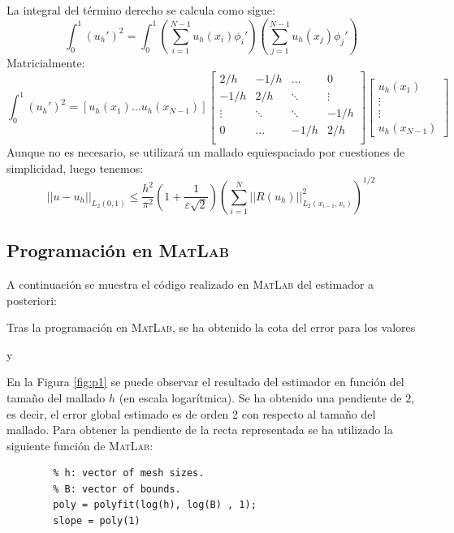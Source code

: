 \documentclass[spanish]{mathnotes}
\begin{document}
	La integral del término derecho se calcula como sigue:
	$$\int_0^1 (u_h')^2 = \int_0^1 \left(\sum_{i=1}^{N-1}u_h(x_i)\phi_i'\right)\left(\sum_{j=1}^{N-1}u_h(x_j)\phi_j'\right)$$
	Matricialmente:
	\begin{equation*}
		\int_0^1 (u_h')^2 =
		\left[
			u_h(x_1) \hdots  u_h(x_{N-1})
		\right]
		\begin{bmatrix}
			2/h  & -1/h & \hdots & 0\\
			-1/h &  2/h & \ddots & \vdots\\
			\vdots & \ddots & \ddots & -1/h\\
			0 & \hdots & -1/h & 2/h\\
		\end{bmatrix}
		\begin{bmatrix}
			u_h(x_1) \\ \vdots \\ \vdots \\ u_h(x_{N-1})
		\end{bmatrix}
	\end{equation*}
	Aunque no es necesario, se utilizará un mallado equiespaciado por cuestiones de simplicidad, luego tenemos:
	\begin{equation*}
		||u-u_h||_{L_2(0,1)} \le 
		\frac{h^2}{\pi^2}\left(1+\frac{1}{\varepsilon\sqrt{2}}\right)
		\left(\sum_{i=1}^{N}||R(u_h)||_{L_2(x_{i-1},x_i)}^2\right)^{1/2}
	\end{equation*}
	\newpage
	\subsection{Programación en \textsc{MatLab}}
	A continuación se muestra el código realizado en \textsc{MatLab} del estimador a posteriori:
		\lstset{style=matlabStyle}
		
	Tras la programación en \textsc{MatLab}, se ha obtenido la cota del error para los valores 
	\begin{center}	
		 y 
	\end{center}
	En la Figura \ref{fig:p1} se puede observar el resultado del estimador en función del tamaño del mallado $h$ (en escala logarítmica). Se ha obtenido una pendiente de $2$, es decir, el error global estimado es de orden 2 con respecto al tamaño del mallado. Para obtener la pendiente de la recta representada se ha utilizado la siguiente función de \textsc{MatLab}:
	\begin{lstlisting}
		% h: vector of mesh sizes.
		% B: vector of bounds.
		poly = polyfit(log(h), log(B) , 1);
		slope = poly(1)
	\end{lstlisting}
	
\end{document}

